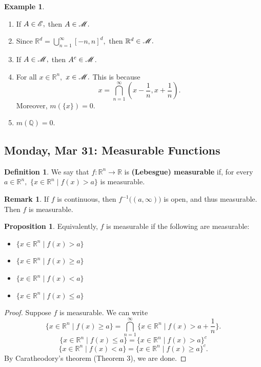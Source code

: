 \documentclass[10pt, oneside]{article}
\newcommand{\bbR}{\mathbb{R}}
\newcommand{\bbQ}{\mathbb{Q}}
\theoremstyle{definition}
\newtheorem{exmp}{Example}[section]
\newtheorem{defn}{Definition}
\newtheorem{prop}{Proposition}
\newtheorem{rem}{Remark}
\begin{document}
\begin{exmp}
\begin{enumerate}
    \item If $A \in \cal E,$ then $ A \in \cal M.$ 
    \item Since $\bbR^d = \bigcup_{n=1}^\infty [-n, n]^d,$ then $\bbR^d \in \cal M.$
    \item If $A \in \cal M,$ then $A^c \in \cal M$.
    \item For all $x\in \bbR^n,$ $x\in \cal M.$ This is because
    \[x = \bigcap_{n=1}^\infty (x- \frac{1}{n}, x + \frac{1}{n}).\] Moreover, $m(\{x\}) = 0.$ 
    \item $m(\bbQ) = 0.$
\end{enumerate}
\end{exmp}

\newpage
\subsection{Monday, Mar 31: Measurable Functions}
\begin{defn}
    We say that $f: \bbR^n \to \bbR$ is \textbf{(Lebesgue) measurable} if, for every $a\in \bbR^n,$ $\{x \in \bbR^n \mid f(x) >a\}$ is measurable.
\end{defn}
\begin{rem}
    If $f$ is continuous, then $f^{-1}\big((a, \infty)\big)$ is open, and thus measurable. Then $f$ is measurable.
\end{rem}
\begin{prop}
    Equivalently, $f$ is measurable if the following are measurable:
    \begin{itemize}
        \item $\{x \in \bbR^n \mid f(x) > a\}$ 
        \item $\{x \in \bbR^n \mid f(x) \geq a\}$ 
        \item $\{x \in \bbR^n \mid f(x) < a\}$ 
        \item $\{x \in \bbR^n \mid f(x) \leq a\}$ 
    \end{itemize}
\end{prop}
\begin{proof}
    Suppose $f$ is measurable. We can write 
    \[\{x \in \bbR^n \mid f(x) \geq a\} = \bigcap_{n=1}^\infty \{x \in \bbR^n \mid f(x) > a + \frac{1}{n}\}.\] 
    \[\{x \in \bbR^n \mid f(x) \leq a\} = \{x \in \bbR^n \mid f(x) > a\}^c\]
    \[\{x \in \bbR^n \mid f(x) < a\} = \{x \in \bbR^n \mid f(x) \geq a\}^c.\] By Caratheodory's theorem (Theorem 3), we are done. 
\end{proof}
\end{document}
